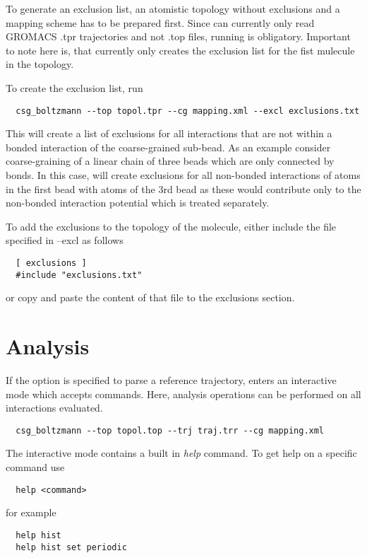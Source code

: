 To generate an exclusion list, an atomistic topology without exclusions and a mapping scheme has to be prepared first. Since \votca can currently only read GROMACS .tpr trajectories and not .top files, running  is obligatory. Important to note here is, that  currently only creates the exclusion list for the fist mulecule in the topology.

To create the exclusion list, run
\begin{verbatim}
  csg_boltzmann --top topol.tpr --cg mapping.xml --excl exclusions.txt
\end{verbatim}
This will create a list of exclusions for all interactions that are not within a bonded interaction of the coarse-grained sub-bead. As an example consider coarse-graining of a linear chain of three beads  which are only connected by bonds. In this case,  will create exclusions for all non-bonded interactions of atoms in the first bead with atoms of the 3rd bead as these would contribute only to the non-bonded interaction potential which is treated separately.

To add the exclusions to the \gromacs topology of the molecule, either include the file specified in --excl as follows
\begin{verbatim}
  [ exclusions ]
  #include "exclusions.txt"
\end{verbatim}
or copy and paste the content of that file to the exclusions section.


\section{Analysis}
If the  option is specified to parse a reference trajectory,  enters an interactive mode which accepts commands. Here, analysis operations can be performed on all interactions evaluated.

\begin{verbatim}
  csg_boltzmann --top topol.top --trj traj.trr --cg mapping.xml
\end{verbatim}

The interactive mode contains a built in \textit{help} command. To get help on a specific command use
\begin{verbatim}
  help <command>
\end{verbatim}
for example
\begin{verbatim}
  help hist
  help hist set periodic
\end{verbatim}

